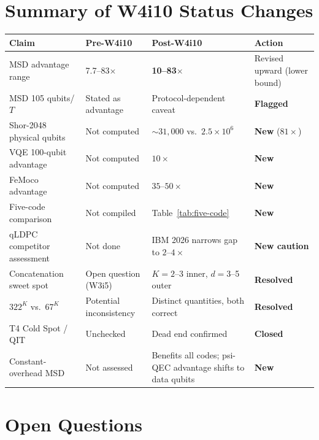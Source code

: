 \documentclass[11pt]{article}
\theoremstyle{definition}
\theoremstyle{remark}
\newcommand{\ee}[1]{\times 10^{#1}}
\begin{document}
\section{Summary of W4i10 Status Changes}
\label{sec:status-changes}

\begin{center}
\begin{tabular}{@{}llll@{}}
\toprule
Claim & Pre-W4i10 & Post-W4i10 & Action \\
\midrule
MSD advantage range & 7.7--83$\times$ & \textbf{10--83$\times$} &
  Revised upward (lower bound) \\
MSD 105 qubits/$T$ & Stated as advantage & Protocol-dependent caveat &
  \textbf{Flagged} \\
Shor-2048 physical qubits & Not computed & $\sim 31{,}000$ vs.\
  $2.5\ee{6}$ & \textbf{New} ($81\times$) \\
VQE 100-qubit advantage & Not computed & $10\times$ & \textbf{New} \\
FeMoco advantage & Not computed & $35$--$50\times$ & \textbf{New} \\
Five-code comparison & Not compiled & Table~\ref{tab:five-code} &
  \textbf{New} \\
qLDPC competitor assessment & Not done & IBM 2026 narrows gap to
  $2$--$4\times$ & \textbf{New caution} \\
Concatenation sweet spot & Open question (W3i5) & $K=2$--3 inner,
  $d=3$--5 outer & \textbf{Resolved} \\
$322^K$ vs.\ $67^K$ & Potential inconsistency & Distinct quantities,
  both correct & \textbf{Resolved} \\
T4 Cold Spot / QIT & Unchecked & Dead end confirmed &
  \textbf{Closed} \\
Constant-overhead MSD & Not assessed & Benefits all codes; psi-QEC
  advantage shifts to data qubits & \textbf{New} \\
\bottomrule
\end{tabular}
\end{center}

\section{Open Questions}
\label{sec:open-questions}
\end{document}
